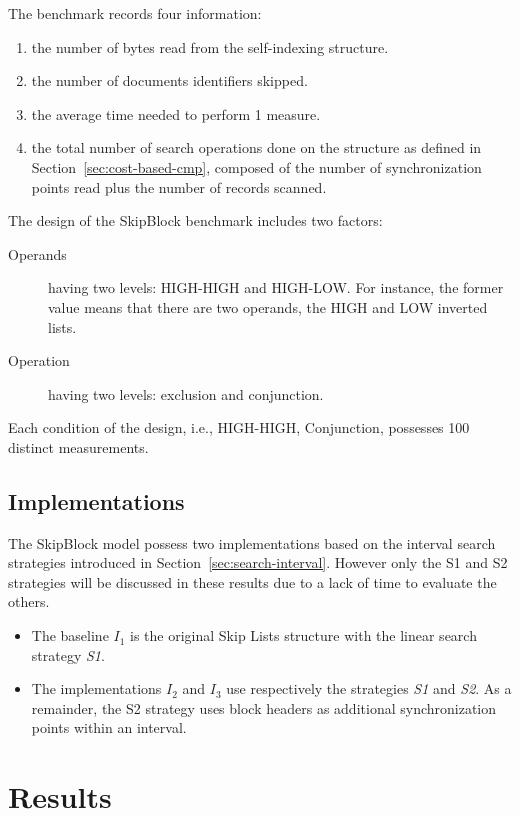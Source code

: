 The benchmark records four information:
\begin{enumerate}
  \item the number of bytes read from the self-indexing structure.
  \item the number of documents identifiers skipped.
  \item the average time needed to perform 1 measure.
  \item the total number of search operations done on the structure as defined
  in Section~\ref{sec:cost-based-cmp}, composed of the number of
  synchronization points read plus the number of records scanned.
\end{enumerate}

The design of the SkipBlock benchmark includes two factors:
\begin{description}
\item[Operands] having two levels: HIGH-HIGH and HIGH-LOW. For instance, the
former value means that there are two operands, the HIGH and LOW inverted lists.
\item[Operation] having two levels: exclusion and conjunction.
\end{description}
Each condition of the design, i.e., HIGH-HIGH, Conjunction, possesses 100
distinct measurements.

\subsection{Implementations}

The SkipBlock model possess two implementations based on the interval search
strategies introduced in Section~\ref{sec:search-interval}. However only the S1
and S2 strategies will be discussed in these results due to a lack of time to
evaluate the others.
\begin{itemize}
  \item The baseline \emph{$I_1$} is the original Skip Lists structure with the
  linear search strategy \emph{S1}.
  \item The implementations \emph{$I_2$} and \emph{$I_3$} use respectively the
  strategies \emph{S1} and \emph{S2}. As a remainder, the S2 strategy uses
  block headers as additional synchronization points within an interval.
\end{itemize}

\section{Results}

